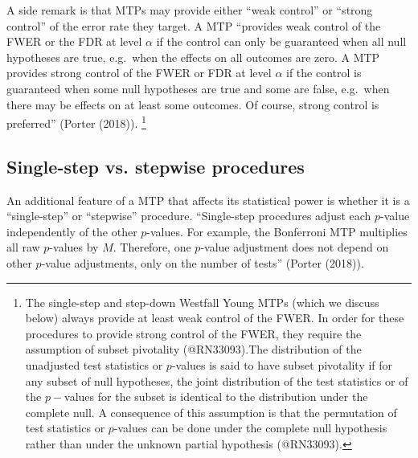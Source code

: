\documentclass[
]{article}
\begin{document}
A side remark is that MTPs may provide either ``weak control'' or
``strong control'' of the error rate they target. A MTP ``provides weak
control of the FWER or the FDR at level \(\alpha\) if the control can
only be guaranteed when all null hypotheses are true, e.g.~when the
effects on all outcomes are zero. A MTP provides strong control of the
FWER or FDR at level \(\alpha\) if the control is guaranteed when some
null hypotheses are true and some are false, e.g.~when there may be
effects on at least some outcomes. Of course, strong control is
preferred'' (Porter (2018)).
\footnote{The single-step and step-down Westfall Young MTPs (which we discuss below) always provide at least weak control of the FWER. In order for these procedures to provide strong control of the FWER, they require the assumption of subset pivotality (@RN33093).The distribution of the unadjusted test statistics or $p$-values is said to have subset pivotality if for any subset of null hypotheses, the joint distribution of the test statistics or of the $p-$values for the subset is identical to the distribution under the complete null.
A consequence of this assumption is that the permutation of test statistics or $p$-values can be done under the complete null hypothesis rather than under the unknown partial hypothesis (@RN33093).}

\subsection{Single-step vs. stepwise procedures}
\label{sec:stepwise}

An additional feature of a MTP that affects its statistical power is
whether it is a ``single-step'' or ``stepwise'' procedure. ``Single-step
procedures adjust each \(p\)-value independently of the other
\(p\)-values. For example, the Bonferroni MTP multiplies all raw
\(p\)-values by \(M\). Therefore, one \(p\)-value adjustment does not
depend on other \(p\)-value adjustments, only on the number of tests''
(Porter (2018)).
\end{document}
